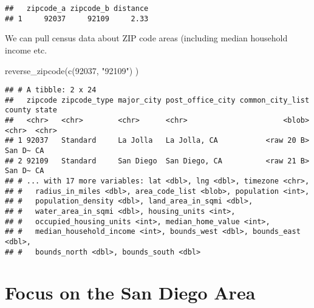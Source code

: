 \documentclass[
]{article}
\newenvironment{Shaded}{\begin{snugshade}}{\end{snugshade}}
\newcommand{\CommentTok}[1]{\textcolor[rgb]{0.56,0.35,0.01}{\textit{#1}}}
\newcommand{\FunctionTok}[1]{\textcolor[rgb]{0.00,0.00,0.00}{#1}}
\newcommand{\NormalTok}[1]{#1}
\newcommand{\OtherTok}[1]{\textcolor[rgb]{0.56,0.35,0.01}{#1}}
\newcommand{\SpecialCharTok}[1]{\textcolor[rgb]{0.00,0.00,0.00}{#1}}
\newcommand{\StringTok}[1]{\textcolor[rgb]{0.31,0.60,0.02}{#1}}
\begin{document}
\begin{verbatim}
##   zipcode_a zipcode_b distance
## 1     92037     92109     2.33
\end{verbatim}

We can pull census data about ZIP code areas (including median household
income etc.

\begin{Shaded}
\begin{Highlighting}[]
\FunctionTok{reverse\_zipcode}\NormalTok{(}\FunctionTok{c}\NormalTok{(}\StringTok{\textquotesingle{}92037\textquotesingle{}}\NormalTok{, }\StringTok{"92109"}\NormalTok{) )}
\end{Highlighting}
\end{Shaded}

\begin{verbatim}
## # A tibble: 2 x 24
##   zipcode zipcode_type major_city post_office_city common_city_list county state
##   <chr>   <chr>        <chr>      <chr>                      <blob> <chr>  <chr>
## 1 92037   Standard     La Jolla   La Jolla, CA           <raw 20 B> San D~ CA   
## 2 92109   Standard     San Diego  San Diego, CA          <raw 21 B> San D~ CA   
## # ... with 17 more variables: lat <dbl>, lng <dbl>, timezone <chr>,
## #   radius_in_miles <dbl>, area_code_list <blob>, population <int>,
## #   population_density <dbl>, land_area_in_sqmi <dbl>,
## #   water_area_in_sqmi <dbl>, housing_units <int>,
## #   occupied_housing_units <int>, median_home_value <int>,
## #   median_household_income <int>, bounds_west <dbl>, bounds_east <dbl>,
## #   bounds_north <dbl>, bounds_south <dbl>
\end{verbatim}

\begin{Shaded}
\end{Shaded}

\hypertarget{focus-on-the-san-diego-area}{%
\section{Focus on the San Diego
Area}\label{focus-on-the-san-diego-area}}

\begin{Shaded}
\end{Shaded}
\end{document}
